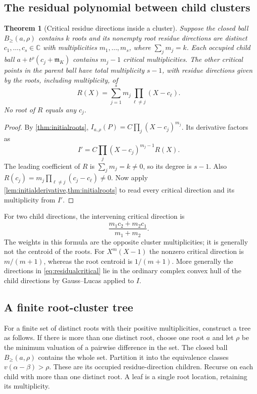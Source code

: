 \documentclass[11pt,letterpaper]{article}
\numberwithin{equation}{section}
\newtheorem{theorem}{Theorem}[section]
\theoremstyle{definition}
\theoremstyle{remark}\newtheorem{remark}[theorem]{Remark}
\newcommand{\C}{\mathbb C}
\newcommand{\mm}{\mathfrak m}
\newcommand{\Bge}[2]{B_{\ge}(#1,#2)}
\begin{document}
\subsection{The residual polynomial between child clusters}
\begin{theorem}[Critical residue directions inside a cluster]
\label{thm:directions}
Suppose the closed ball $\Bge a\rho$ contains $k$ roots and its
nonempty root residue directions are distinct $c_1,\ldots,c_s\in\C$
with multiplicities $m_1,\ldots,m_s$, where $\sum_jm_j=k$.
Each occupied child ball $a+t^\rho(c_j+\mm_K)$ contains $m_j-1$
critical multiplicities. The other critical points in the parent ball
have total multiplicity $s-1$, with residue directions given by the
roots, including multiplicity, of
\begin{equation}\label{eq:residualcritical}
 R(X)=\sum_{j=1}^s m_j\prod_{\ell\ne j}(X-c_\ell).
\end{equation}
No root of $R$ equals any $c_j$.
\end{theorem}
\begin{proof}
By \cref{thm:initialroots},
$I_{a,\rho}(P)=C\prod_j(X-c_j)^{m_j}$. Its derivative factors as
\[
 I' = C\prod_j(X-c_j)^{m_j-1}R(X).
\]
The leading coefficient of $R$ is $\sum_jm_j=k\ne0$, so its degree
is $s-1$. Also
$R(c_j)=m_j\prod_{\ell\ne j}(c_j-c_\ell)\ne0$.
Now apply \cref{lem:initialderivative,thm:initialroots} to read every
critical direction and its multiplicity from $I'$.
\end{proof}
For two child directions, the intervening critical direction is
\[
 \frac{m_1c_2+m_2c_1}{m_1+m_2}.
\]
The weights in this formula are the opposite cluster multiplicities;
it is generally not the centroid of the roots. For $X^m(X-1)$ the
nonzero critical direction is $m/(m+1)$, whereas the root centroid is
$1/(m+1)$. More generally the directions in \eqref{eq:residualcritical}
lie in the ordinary complex convex hull of the child directions by
Gauss--Lucas applied to $I$.

\subsection{A finite root-cluster tree}
For a finite set of distinct roots with their positive multiplicities,
construct a tree as follows. If there is more than one distinct root,
choose one root $a$ and let $\rho$ be the minimum valuation of a pairwise
difference in the set. The closed ball $\Bge a\rho$ contains the whole
set. Partition it into the equivalence classes
$v(\alpha-\beta)>\rho$. These are its occupied residue-direction
children. Recurse on each child with more than one distinct root.
A leaf is a single root location, retaining its multiplicity.
\end{document}
